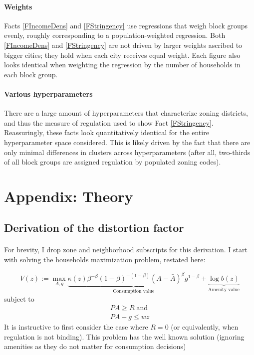 \documentclass[12pt]{article}
\begin{document}
	\paragraph*{Weights} Facts \ref{FIncomeDens} and \ref{FStringency} use regressions that weigh block groups evenly, roughly corresponding to a population-weighted regression. Both \ref{FIncomeDens} and \ref{FStringency} are not driven by larger weights ascribed to bigger cities; they hold when each city receives equal weight. Each figure also looks identical when weighting the regression by the number of households in each block group.
	
	\paragraph*{Various hyperparameters} There are a large amount of hyperparameters that characterize zoning districts, and thus the measure of regulation used to show Fact \ref{FStringency}. Reassuringly, these facts look quantitatively identical for the entire hyperparameter space considered. This is likely driven by the fact that there are only minimal differences in clusters across hyperparameters (after all, two-thirds of all block groups are assigned regulation by populated zoning codes). 
	
	
	
	\clearpage 
	\section{Appendix: Theory}\label{TheoryAppendix}
	
	\subsection{Derivation of the distortion factor}\label{derive_distortion}
	\paragraph*{}
	For brevity, I drop zone and neighborhood subscripts for this derivation. I start with solving the households maximization problem, restated here:
	
	\begin{equation}
		V(z) := \max_{A, g} \underbrace{\kappa(z)\beta^{-\beta}(1-\beta)^{-(1-\beta)}(A - \bar{A})^{\beta}g^{1-\beta}}_{\text{Consumption value}} + \underbrace{\log b(z)}_{\text{Amenity value}}
	\end{equation} 
	subject to
	\begin{eqnarray*}
		PA \geq R \; \text{and} \\
		PA + g \leq wz
	\end{eqnarray*}
	It is instructive to first consider the case where $R = 0$ (or equivalently, when regulation is not binding). This problem has the well known solution (ignoring amenities as they do not matter for consumption decisions)
	
\end{document}
